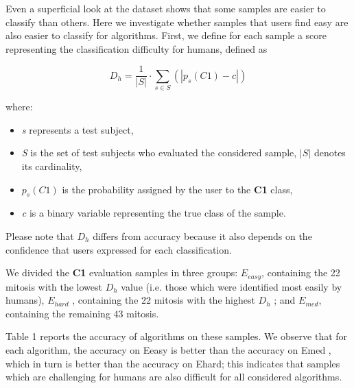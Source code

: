 Even a superficial look at the dataset shows that some samples are easier to classify than others.
Here we investigate whether samples that users find easy are also easier to classify for algorithms.
First, we define for each sample a score representing the classification difficulty for humans, defined as

\begin{equation}
 D_h = \frac{1}{|S|} \cdot \sum_{s \in S} \left(  |p_s(C1) - c |  \right)
\end{equation}

\noindent where:

\begin{itemize}
 \item \textit{s} represents a test subject,
 \item \textit{S} is the set of test subjects who evaluated the considered sample, $|S|$ denotes its cardinality,
 \item $p_s(C1)$ is the probability assigned by the user to the \textbf{C1} class,
 \item \textit{c} is a binary variable representing the true class of the sample.
\end{itemize}

Please note that $D_h$ differs from accuracy because it also depends on the confidence that users expressed for each classification.

We divided the \textbf{C1} evaluation samples in three groups: $E_{easy}$, containing the 22 mitosis with the lowest $D_h$ value 
(i.e. those which were identified most easily by humans), $E_{hard}$ , containing the 22 mitosis with the highest $D_h$ ; and $E_{med}$,
containing the remaining 43 mitosis.








Table 1 reports the accuracy of algorithms on these samples. We observe that for each algorithm, the accuracy on Eeasy is
better than the accuracy on Emed , which in turn is better than the accuracy
on Ehard; this indicates that samples which are challenging for humans are also
difficult for all considered algorithms.



